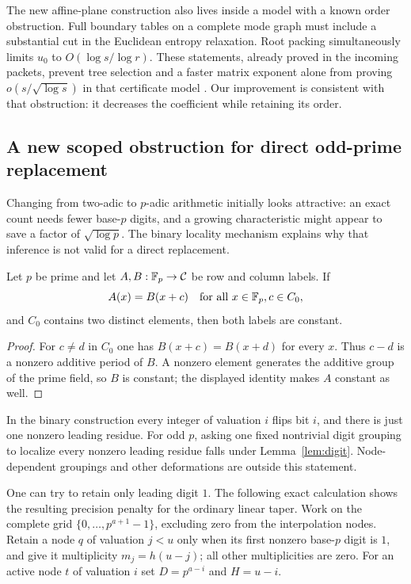 The new affine-plane construction also lives inside a model with a known
order obstruction. Full boundary tables on a complete mode graph must
include a substantial cut in the Euclidean entropy relaxation. Root packing
simultaneously limits $u_0$ to $O(\log s/\log r)$. These statements,
already proved in the incoming packets, prevent tree selection and a faster
matrix exponent alone from proving $o(s/\sqrt{\log s})$ in that
certificate model \cite{rectangular,portfolio}. Our improvement is
consistent with that obstruction: it decreases the coefficient while
retaining its order.

\subsection{A new scoped obstruction for direct odd-prime replacement}
Changing from two-adic to $p$-adic arithmetic initially looks attractive:
an exact count needs fewer base-$p$ digits, and a growing characteristic
might appear to save a factor of $\sqrt{\log p}$. The binary locality
mechanism explains why that inference is not valid for a direct replacement.

\begin{lemma}\label{lem:digit}
Let $p$ be prime and let $A,B:\mathbb F_p\to\mathcal C$ be row and column
labels. If
\[
 A(x)=B(x+c)\quad\text{for all }x\in\mathbb F_p, c\in C_0,
\]
and $C_0$ contains two distinct elements, then both labels are constant.
\end{lemma}
\begin{proof}
For $c\ne d$ in $C_0$ one has $B(x+c)=B(x+d)$ for every $x$.
Thus $c-d$ is a nonzero additive period of $B$. A nonzero element
generates the additive group of the prime field, so $B$ is constant;
the displayed identity makes $A$ constant as well.
\end{proof}

In the binary construction every integer of valuation $i$ flips bit $i$,
and there is just one nonzero leading residue. For odd $p$, asking one
fixed nontrivial digit grouping to localize every nonzero leading residue
falls under Lemma~\ref{lem:digit}. Node-dependent groupings and other
deformations are outside this statement.

One can try to retain only leading digit $1$. The following exact
calculation shows the resulting precision penalty for the ordinary linear
taper. Work on the complete grid $\{0,\ldots,p^{a+1}-1\}$, excluding
zero from the interpolation nodes. Retain a node $q$ of valuation $j<u$
only when its first nonzero base-$p$ digit is $1$, and give it multiplicity
$m_j=h(u-j)$; all other multiplicities are zero. For an active node $t$
of valuation $i$ set $D=p^{a-i}$ and $H=u-i$.

